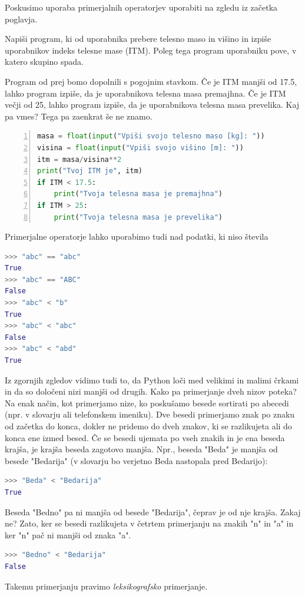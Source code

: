 Poskusimo uporaba primerjalnih operatorjev uporabiti na zgledu iz začetka poglavja.
\begin{zgled}
Napiši program, ki od uporabnika prebere telesno maso in višino in izpiše uporabnikov indeks telesne mase (ITM). Poleg tega program uporabniku pove, v katero skupino spada. 
\end{zgled}
\begin{resitev}
Program od prej bomo dopolnili s pogojnim stavkom. Če je ITM manjši od 17.5, lahko program izpiše, da je uporabnikova telesna masa premajhna. Če je ITM večji od 25, lahko program izpiše, da je uporabnikova telesna masa prevelika. Kaj pa vmes? Tega pa zaenkrat še ne znamo. 
\begin{lstlisting}[language=Python, showstringspaces=false,numbers=left]
masa = float(input("Vpiši svojo telesno maso [kg]: "))
visina = float(input("Vpiši svojo višino [m]: "))
itm = masa/visina**2
print("Tvoj ITM je", itm)
if ITM < 17.5:
    print("Tvoja telesna masa je premajhna")
if ITM > 25:
    print("Tvoja telesna masa je prevelika")
\end{lstlisting}
\end{resitev}

Primerjalne operatorje lahko uporabimo tudi nad podatki, ki niso števila
\begin{lstlisting}[language=Python, showstringspaces=false]
>>> "abc" == "abc"
True
>>> "abc" == "ABC"
False
>>> "abc" < "b"
True
>>> "abc" < "abc"
False
>>> "abc" < "abd"
True
\end{lstlisting}
Iz zgornjih zgledov vidimo tudi to, da Python loči med velikimi in malimi črkami in da so določeni nizi manjši od drugih. Kako pa primerjanje dveh nizov poteka? Na enak način, kot primerjamo nize, ko poskušamo besede sortirati po abecedi (npr. v slovarju ali telefonskem imeniku). Dve besedi primerjamo znak po znaku od začetka do konca, dokler ne pridemo do dveh znakov, ki se razlikujeta ali do konca ene izmed besed. Če se besedi ujemata po vseh znakih in je ena beseda krajša, je krajša beseda zagotovo manjša. Npr., beseda "Beda" je manjša od besede "Bedarija" (v slovarju bo verjetno Beda nastopala pred Bedarijo):
\begin{lstlisting}[language=Python, showstringspaces=false]
>>> "Beda" < "Bedarija"
True
\end{lstlisting}
Beseda "Bedno" pa ni manjša od besede "Bedarija", čeprav je od nje krajša. Zakaj ne? Zato, ker se besedi razlikujeta v četrtem primerjanju na znakih "n" in "a" in ker "n" pač ni manjši od znaka "a".
\begin{lstlisting}[language=Python, showstringspaces=false]
>>> "Bedno" < "Bedarija"
False
\end{lstlisting}
Takemu primerjanju pravimo \emph{leksikografsko} primerjanje. 

